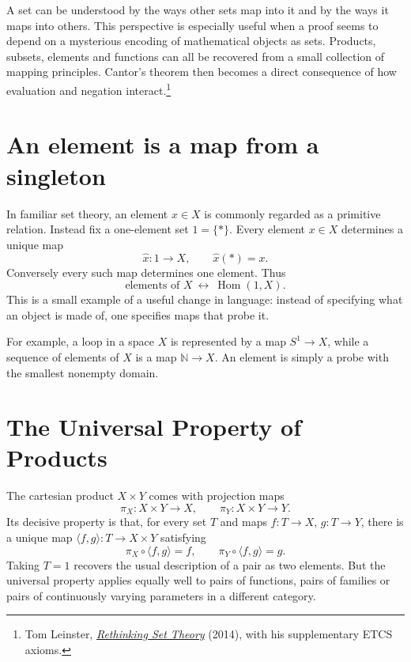 
A set can be understood by the ways other sets map into it and by the ways it maps into others. This perspective is especially useful when a proof seems to depend on a mysterious encoding of mathematical objects as sets. Products, subsets, elements and functions can all be recovered from a small collection of mapping principles. Cantor's theorem then becomes a direct consequence of how evaluation and negation interact.\footnote{Tom Leinster, \href{https://pages.jh.edu/rrynasi1/NewFoundations4Math/Literature/Set/Leinster2014RethinkingSetTheory.pdf}{\emph{Rethinking Set Theory}} (2014), with his supplementary ETCS axioms.}

\section{An element is a map from a singleton}

In familiar set theory, an element \(x\in X\) is commonly regarded as a primitive relation. Instead fix a one-element set \(1=\{*\}\). Every element \(x\in X\) determines a unique map
\[
 \widehat x:1\longrightarrow X,\qquad \widehat x(*)=x.
\]
Conversely every such map determines one element. Thus
\[
 \boxed{\text{elements of }X\ \longleftrightarrow\ \operatorname{Hom}(1,X).}
\]
This is a small example of a useful change in language: instead of specifying what an object is made of, one specifies maps that probe it.

For example, a loop in a space \(X\) is represented by a map \(S^1\to X\), while a sequence of elements of \(X\) is a map \(\mathbb N\to X\). An element is simply a probe with the smallest nonempty domain.

\section{The Universal Property of Products}

The cartesian product \(X\times Y\) comes with projection maps
\[
 \pi_X:X\times Y\to X,\qquad
 \pi_Y:X\times Y\to Y.
\]
Its decisive property is that, for every set \(T\) and maps \(f:T\to X\), \(g:T\to Y\), there is a unique map \(\langle f,g\rangle:T\to X\times Y\) satisfying
\[
 \pi_X\circ\langle f,g\rangle=f,\qquad
 \pi_Y\circ\langle f,g\rangle=g.
\]
Taking \(T=1\) recovers the usual description of a pair as two elements. But the universal property applies equally well to pairs of functions, pairs of families or pairs of continuously varying parameters in a different category.

